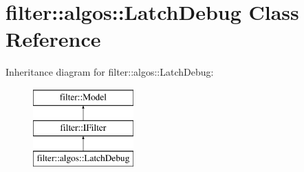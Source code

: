 \hypertarget{classfilter_1_1algos_1_1_latch_debug}{}\section{filter\+:\+:algos\+:\+:Latch\+Debug Class Reference}
\label{classfilter_1_1algos_1_1_latch_debug}
Inheritance diagram for filter\+:\+:algos\+:\+:Latch\+Debug\+:\begin{figure}[H]
\begin{center}
\leavevmode
\includegraphics[height=3.000000cm]{d1/d69/classfilter_1_1algos_1_1_latch_debug}
\end{center}
\end{figure}
